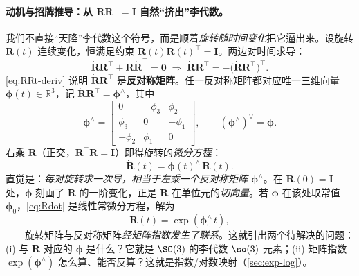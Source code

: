 \paragraph{动机与招牌推导：从 $\mathbf{R}\mathbf{R}^\top=\mathbf{I}$ 自然“挤出”李代数。}
我们不直接“天降”李代数这个符号，而是顺着\emph{旋转随时间变化}把它逼出来\cite{gaoxiang2019slam14}。设旋转 $\mathbf{R}(t)$ 连续变化，恒满足约束 $\mathbf{R}(t)\mathbf{R}(t)^\top=\mathbf{I}$。两边对时间求导：
\begin{equation}
  \dot{\mathbf{R}}\mathbf{R}^\top+\mathbf{R}\dot{\mathbf{R}}^\top=\mathbf{0}
  \;\Longrightarrow\;
  \dot{\mathbf{R}}\mathbf{R}^\top=-\big(\dot{\mathbf{R}}\mathbf{R}^\top\big)^\top.
  \label{eq:RRt-deriv}
\end{equation}
\cref{eq:RRt-deriv} 说明 $\dot{\mathbf{R}}\mathbf{R}^\top$ 是\textbf{反对称矩阵}。任一反对称矩阵都对应唯一三维向量 $\boldsymbol{\phi}(t)\in\mathbb{R}^3$，记 $\dot{\mathbf{R}}\mathbf{R}^\top=\boldsymbol{\phi}^\wedge$，其中
\begin{equation}
  \boldsymbol{\phi}^\wedge=\begin{bmatrix}0&-\phi_3&\phi_2\\\phi_3&0&-\phi_1\\-\phi_2&\phi_1&0\end{bmatrix},\qquad (\boldsymbol{\phi}^\wedge)^\vee=\boldsymbol{\phi}.
  \label{eq:hat}
\end{equation}
右乘 $\mathbf{R}$（正交，$\mathbf{R}^\top\mathbf{R}=\mathbf{I}$）即得旋转的\emph{微分方程}：
\begin{equation}
  \dot{\mathbf{R}}(t)=\boldsymbol{\phi}(t)^\wedge\,\mathbf{R}(t).
  \label{eq:Rdot}
\end{equation}
直觉是：\emph{每对旋转求一次导，相当于左乘一个反对称矩阵 $\boldsymbol{\phi}^\wedge$}。在 $\mathbf{R}(0)=\mathbf{I}$ 处，$\boldsymbol{\phi}$ 刻画了 $\mathbf{R}$ 的一阶变化，正是 $\mathbf{R}$ 在单位元的\emph{切向量}。若 $\boldsymbol{\phi}$ 在该处取常值 $\boldsymbol{\phi}_0$，\cref{eq:Rdot} 是线性常微分方程，解为
\begin{equation}
  \mathbf{R}(t)=\exp(\boldsymbol{\phi}_0^\wedge\, t),
  \label{eq:exp-emerge}
\end{equation}
——旋转矩阵与反对称矩阵\emph{经矩阵指数发生了联系}。这就引出两个待解决的问题：(i) 与 $\mathbf{R}$ 对应的 $\boldsymbol{\phi}$ 是什么？它就是 $\SO(3)$ 的李代数 $\so(3)$ 元素；(ii) 矩阵指数 $\exp(\boldsymbol{\phi}^\wedge)$ 怎么算、能否反算？这就是指数/对数映射（\cref{sec:exp-log}）。

